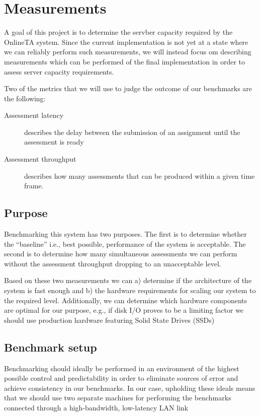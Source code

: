 \chapter{Measurements}
A goal of this project is to determine the servber capacity required by
the OnlineTA system. Since the current implementation is not yet at a
state where we can reliably perform such measurements, we will instead
focus om describing measurements which can be performed of the final
implementation in order to assess server capacity requirements.

Two of the metrics that we will use to judge the outcome of our
benchmarks are the following:
\begin{description}
\item[Assessment latency] describes the delay between the submission
  of an assignment until the assessment is ready
\item[Assessment throughput] describes how many assessments that can
  be produced within a given time frame.
\end{description}


\section{Purpose}
Benchmarking this system has two purposes. The first is to determine
whether the "`baseline"' i.e., best possible, performance of the
system is acceptable. The second is to determine how many simultaneous
assessments we can perform without the assessment throughput dropping
to an unacceptable level.

Based on these two measurements we can a) determine if the
architecture of the system is fast enough and b) the hardware
requirements for scaling our system to the required
level. Additionally, we can determine which hardware components are
optimal for our purpose, e.g., if disk I/O proves to be a limiting
factor we should use production hardware featuring Solid State Drives
(SSDs)

\section{Benchmark setup}
Benchmarking should ideally be performed in an environment of the
highest possible control and predictability in order to eliminate
sources of error and achieve consistency in our benchmarks. In our
case, upholding these ideals means that we should use two separate
machines for performing the benchmarks connected through a
high-bandwidth, low-latency LAN link

